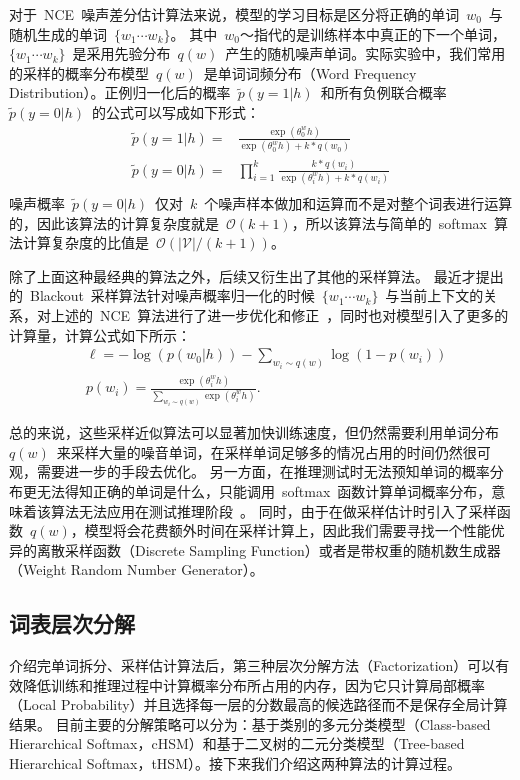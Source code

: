 对于~NCE~噪声差分估计算法来说，模型的学习目标是区分将正确的单词~$w_0$~与随机生成的单词~$\{w_1\cdots w_k\}$。
其中~$w_0$～指代的是训练样本中真正的下一个单词，$\{w_1\cdots w_k\}$~是采用先验分布~$q(w)$~产生的随机噪声单词。实际实验中，我们常用的采样的概率分布模型~$q(w)$~是单词词频分布（Word Frequency Distribution）。正例归一化后的概率~$\tilde{p}(y=1|h)$~和所有负例联合概率~$\tilde{p}(y=0|h)$~的公式可以写成如下形式：
\begin{equation}\label{equ:nce}
\begin{split}
  \tilde{p}(y=1|h)=&\frac{\exp( \theta^w_0 h)}{ \exp( \theta^w_0 h)+k *q(w_0)}\\
  \tilde{p}(y=0|h)=&\prod_{i=1}^{k}\frac{k *q(w_i)}{\exp( \theta^w_i h)+k *q(w_i)}\\
\end{split}
\end{equation}
噪声概率~$\tilde{p}(y=0|h)$~仅对~$k$~个噪声样本做加和运算而不是对整个词表进行运算的，因此该算法的计算复杂度就是~$\mathcal{O}(k+1)$，所以该算法与简单的~softmax~算法计算复杂度的比值是~$\mathcal{O}(\mathcal{|V|}/(k+1))$。

除了上面这种最经典的算法之外，后续又衍生出了其他的采样算法。
最近才提出的~Blackout~采样算法针对噪声概率归一化的时候~$\{w_1\cdots w_k\}$~与当前上下文的关系，对上述的~NCE~算法进行了进一步优化和修正~，同时也对模型引入了更多的计算量，计算公式如下所示：
\begin{equation}
\begin{split}
&\ell=-\log(p(w_0|h)) - \sum_{w_i \sim q(w)} \log(1 - p(w_i))\\
&p(w_i) = \frac{\exp(\theta^w_i h)}{\sum_{w_i \sim q(w)} \exp(\theta^w_i h)}.
\end{split}
\end{equation}

总的来说，这些采样近似算法可以显著加快训练速度，但仍然需要利用单词分布$q(w)$~来采样大量的噪音单词，在采样单词足够多的情况占用的时间仍然很可观，需要进一步的手段去优化。
另一方面，在推理测试时无法预知单词的概率分布更无法得知正确的单词是什么，只能调用~softmax~函数计算单词概率分布，意味着该算法无法应用在测试推理阶段~。
同时，由于在做采样估计时引入了采样函数~$q(w)$，模型将会花费额外时间在采样计算上，因此我们需要寻找一个性能优异的离散采样函数（Discrete Sampling Function）或者是带权重的随机数生成器（Weight Random Number Generator）。


\subsection{词表层次分解}
介绍完单词拆分、采样估计算法后，第三种层次分解方法（Factorization）可以有效降低训练和推理过程中计算概率分布所占用的内存，因为它只计算局部概率（Local Probability）并且选择每一层的分数最高的候选路径而不是保存全局计算结果。
目前主要的分解策略可以分为：基于类别的多元分类模型（Class-based Hierarchical Softmax，cHSM）和基于二叉树的二元分类模型（Tree-based Hierarchical Softmax，tHSM）。接下来我们介绍这两种算法的计算过程。


